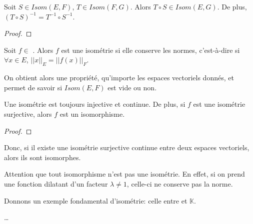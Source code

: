 \begin{proposition}
	Soit $S \in Isom(E, F)$, $T \in Isom(F, G)$.
	Alors $T \circ S \in Isom(E, G)$. De plus, $(T \circ S)^{-1} = T^{-1} \circ
	S^{-1}$.
\end{proposition}

\begin{proof}
	
\end{proof}

\begin{definition}
\label{definition_isometrie}
	Soit $f \in$ .
	Alors $f$ est une isométrie si elle conserve les normes, c'est-à-dire si
	$\forall x \in E$, $||x||_{E} =  ||f(x)||_{F}$.
\end{definition}

On obtient alors une propriété, qu'importe les espaces vectoriels donnés, et
permet de savoir si $Isom(E, F)$ est vide ou non.

\begin{proposition}
	Une isométrie est toujours injective et continue. De plus, si $f$ est une
	isométrie surjective, alors $f$ est un isomorphisme.
\end{proposition}

\begin{proof}
	
\end{proof}

Donc, si il existe une isométrie surjective continue entre deux espaces
vectoriels, alors ils sont isomorphes.

Attention que tout isomorphisme n'est pas une isométrie. En effet, si on prend
une fonction dilatant d'un facteur $\lambda \neq 1$, celle-ci ne conserve pas la
norme.

Donnons un exemple fondamental d'isométrie: celle entre
 et $\mathbb{K}$.

\ldots
